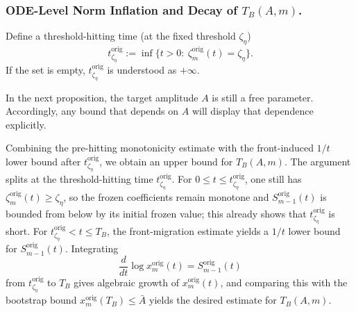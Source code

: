 \documentclass[reqno,11pt]{amsart}
\begin{document}
\subsubsection{ODE-Level Norm Inflation and Decay of $T_B(A,m)$.}
\label{subsec:ODE_norm_inflation}
Define a threshold-hitting time (at the fixed threshold $\zeta_\eta$)
\begin{equation*}
t_{\zeta_\eta}^{\mathrm{orig}}:=\inf\{t>0:\ \zeta_m^{\mathrm{orig}}(t)=\zeta_\eta\}.
\end{equation*}
If the set is empty, $t_{\zeta_\eta}^{\mathrm{orig}}$ is understood as $+\infty$.

In the next proposition, the target amplitude $A$ is still a free parameter. 
Accordingly, any bound that depends on $A$ will display that dependence explicitly. 


Combining the pre-hitting monotonicity estimate with the front-induced $1/t$ lower bound after $t_{\zeta_\eta}^{\mathrm{orig}}$, we obtain an upper bound for $T_B(A,m)$. The argument splits at the threshold-hitting time $t_{\zeta_\eta}^{\mathrm{orig}}$. For $0\le t\le t_{\zeta_\eta}^{\mathrm{orig}}$, one still has $\zeta_m^{\mathrm{orig}}(t)\ge \zeta_\eta$, so the frozen coefficients remain monotone and $S_{m-1}^{\mathrm{orig}}(t)$ is bounded from below by its initial frozen value; this already shows that $t_{\zeta_\eta}^{\mathrm{orig}}$ is short. For $t_{\zeta_\eta}^{\mathrm{orig}}<t\le T_B$, the front-migration estimate yields a $1/t$ lower bound for $S_{m-1}^{\mathrm{orig}}(t)$. Integrating
\[
\frac{d}{dt}\log x_m^{\mathrm{orig}}(t)=S_{m-1}^{\mathrm{orig}}(t)
\]
from $t_{\zeta_\eta}^{\mathrm{orig}}$ to $T_B$ gives algebraic growth of $x_m^{\mathrm{orig}}(t)$, and comparing this with the bootstrap bound $x_m^{\mathrm{orig}}(T_B)\le \bar A$ yields the desired estimate for $T_B(A,m)$.
\end{document}

